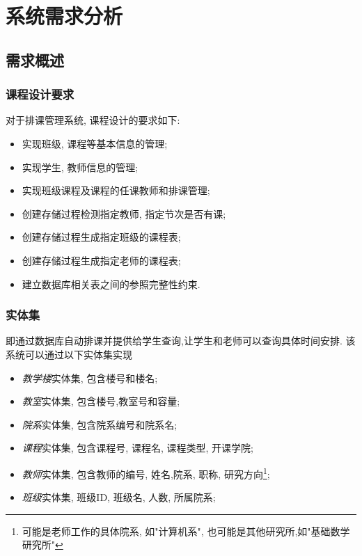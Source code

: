 \documentclass{myreport}
\begin{document}
\maketitle

\newpage
\tableofcontents
\newpage

\section{系统需求分析}
  \subsection{需求概述}
    \subsubsection{课程设计要求}
      对于排课管理系统, 课程设计的要求如下:
      \begin{itemize}
        \item 实现班级, 课程等基本信息的管理;
        \item 实现学生, 教师信息的管理;
        \item 实现班级课程及课程的任课教师和排课管理;
        \item 创建存储过程检测指定教师, 指定节次是否有课;
        \item 创建存储过程生成指定班级的课程表;
        \item 创建存储过程生成指定老师的课程表;
        \item 建立数据库相关表之间的参照完整性约束.
      \end{itemize}
    \subsubsection{实体集}
      即通过数据库自动排课并提供给学生查询,让学生和老师可以查询具体时间安排.
      该系统可以通过以下实体集实现
      \begin{itemize}
        \item \emph{教学楼}实体集, 包含楼号和楼名;
        \item \emph{教室}实体集, 包含楼号,教室号和容量;
        \item \emph{院系}实体集, 包含院系编号和院系名;
        \item \emph{课程}实体集, 包含课程号, 课程名, 课程类型, 开课学院;
        \item \emph{教师}实体集, 包含教师的编号, 姓名,院系, 职称, 研究方向\footnote{可能是老师工作的具体院系, 如"计算机系", 也可能是其他研究所,如"基础数学研究所"};
        \item \emph{班级}实体集, 班级ID, 班级名, 人数, 所属院系;
      \end{itemize}
\end{document}
